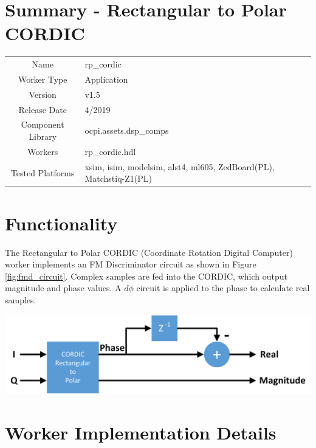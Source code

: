 \documentclass{article}
\author{} %
\date{Version \docVersion} %
\title{\docTitle}
\def\docVersion{1.5}
\def\comp{rp\_cordic}
\def\Comp{Rectangular to Polar CORDIC}
\begin{document}
\section*{Summary - \Comp}
\begin{tabular}{|c|M{13.5cm}|}
	\hline
	                  &                                                    \\
	\hline
	Name              & \comp                                              \\
	\hline
	Worker Type       & Application                                        \\
	\hline
	Version           & v\docVersion \\
	\hline
	Release Date      & 4/2019 \\
	\hline
	Component Library & ocpi.assets.dsp\_comps                              \\
	\hline
	Workers           & \comp.hdl                                          \\
	\hline
	Tested Platforms  & xsim, isim, modelsim, alst4, ml605, ZedBoard(PL), Matchstiq-Z1(PL) \\
	\hline
\end{tabular}

\section*{Functionality}
\begin{flushleft}
	The Rectangular to Polar CORDIC (Coordinate Rotation Digital Computer) worker implements an FM Discriminator circuit as shown in Figure \ref{fig:fmd_circuit}. Complex samples are fed into the CORDIC, which output magnitude and phase values. A $d\phi$ circuit is applied to the phase to calculate real samples.
\end{flushleft}
{\centering\captionsetup{type=figure}\includegraphics[scale=0.8]{fmd_circuit}\par{}\label{fig:fmd_circuit}}

\section*{Worker Implementation Details}
\end{document}

